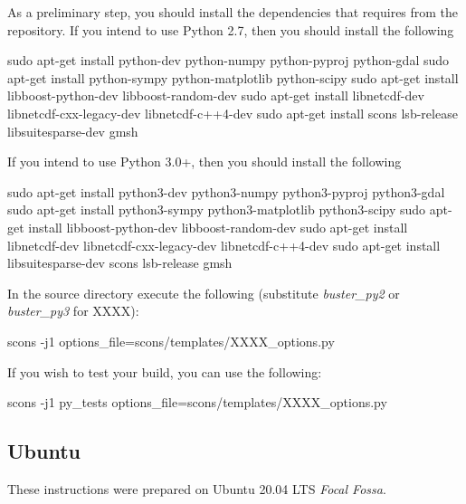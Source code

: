 \noindent As a preliminary step, you should install the dependencies that \esfinley requires from the repository.
If you intend to use Python 2.7, then you should install the following
\begin{shellCode}
sudo apt-get install python-dev python-numpy python-pyproj python-gdal
sudo apt-get install python-sympy python-matplotlib python-scipy
sudo apt-get install libboost-python-dev libboost-random-dev
sudo apt-get install libnetcdf-dev libnetcdf-cxx-legacy-dev libnetcdf-c++4-dev
sudo apt-get install scons lsb-release libsuitesparse-dev gmsh
\end{shellCode}

\noindent If you intend to use Python 3.0+, then you should install the following
\begin{shellCode}
sudo apt-get install python3-dev python3-numpy python3-pyproj python3-gdal
sudo apt-get install python3-sympy python3-matplotlib python3-scipy
sudo apt-get install libboost-python-dev libboost-random-dev
sudo apt-get install libnetcdf-dev libnetcdf-cxx-legacy-dev libnetcdf-c++4-dev
sudo apt-get install libsuitesparse-dev scons lsb-release gmsh
\end{shellCode}

\noindent In the source directory execute the following (substitute \textit{buster_py2} or \textit{buster_py3} for XXXX):
\begin{shellCode}
scons -j1 options_file=scons/templates/XXXX_options.py
\end{shellCode}

\noindent If you wish to test your build, you can use the following:
\begin{shellCode}
scons -j1 py_tests options_file=scons/templates/XXXX_options.py
\end{shellCode}


\subsection{Ubuntu}\label{sec:ubsrc}
These instructions were prepared on Ubuntu 20.04 LTS \textit{Focal Fossa}. \newline


